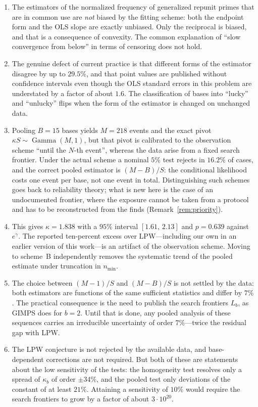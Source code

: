 \documentclass[11pt,a4paper]{article}
\theoremstyle{plain}
\theoremstyle{remark}
\newcommand{\eg}{e^{\gamma}}
\DeclareMathOperator{\Gam}{Gamma}
\begin{document}
\begin{enumerate}
\item The estimators of the normalized frequency of generalized repunit primes
that are in common use are \emph{not} biased by the fitting scheme: both the
endpoint form and the OLS slope are exactly unbiased. Only the reciprocal is
biased, and that is a consequence of convexity. The common explanation of ``slow
convergence from below'' in terms of censoring does not hold.

\item The genuine defect of current practice is that different forms of the
estimator disagree by up to $29.5\%$, and that point values are published
without confidence intervals even though the OLS standard errors in this problem
are understated by a factor of about $1.6$. The classification of bases into
``lucky'' and ``unlucky'' flips when the form of the estimator is changed on
unchanged data.

\item Pooling $B=15$ bases yields $M=218$ events and the exact pivot
$\kappa S\sim\Gam(M,1)$, but that pivot is calibrated to the observation scheme
``until the $N$-th event'', whereas the data arise from a fixed search frontier.
Under the actual scheme a nominal $5\%$ test rejects in $16.2\%$ of cases, and
the correct pooled estimator is $(M-B)/S$: the conditional likelihood costs one
event per base, not one event in total. Distinguishing such schemes goes back to
reliability theory; what is new here is the case of an undocumented frontier,
where the exposure cannot be taken from a protocol and has to be reconstructed
from the finds (Remark~\ref{rem:priority}).

\item This gives $\kappa=1.838$ with a $95\%$ interval $[1.61,\,2.13]$ and
$p=0.639$ against $\eg$. The reported ten-percent excess over LPW---including
our own in an earlier version of this work---is an artifact of the observation
scheme. Moving to scheme~B independently removes the systematic trend of the
pooled estimate under truncation in $n_{\min}$.

\item The choice between $(M-1)/S$ and $(M-B)/S$ is not settled by the data:
both estimators are functions of the same sufficient statistics and differ by
$7\%$. The practical consequence is the need to publish the search frontiers
$L_b$, as GIMPS does for $b=2$. Until that is done, any pooled analysis of these
sequences carries an irreducible uncertainty of order $7\%$---twice the residual
gap with LPW.

\item The LPW conjecture is not rejected by the available data, and
base-dependent corrections are not required. But both of these are statements
about the low sensitivity of the tests: the homogeneity test resolves only a
spread of $\kappa_b$ of order $\pm34\%$, and the pooled test only deviations of
the constant of at least $21\%$. Attaining a sensitivity of $10\%$ would require
the search frontiers to grow by a factor of about $3\cdot10^{20}$.
\end{enumerate}
\end{document}
